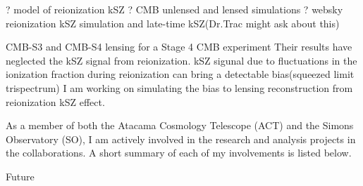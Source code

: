 \documentclass[12pt, notitlepage, onecolumn, amsmath, amssymb, aps]{revtex4-1}
\begin{document}
? model of reionization kSZ
? CMB unlensed and lensed simulations
? websky reionization kSZ simulation and late-time kSZ(Dr.Trac might ask about this)

CMB-S3 and CMB-S4 lensing 
for a Stage 4 CMB experiment
Their results have neglected the kSZ signal from reionization. 
kSZ sigunal due to fluctuations in the ionization fraction during reionization can bring a detectable bias(squeezed limit trispectrum)
I am working on simulating the bias to lensing reconstruction from reionization kSZ effect. 


As a member of both the Atacama Cosmology Telescope (ACT) and the
Simons Observatory (SO), I am actively involved in the research and
analysis projects in the collaborations. A short summary of each of my
involvements is listed below.

Future


\end{document}
